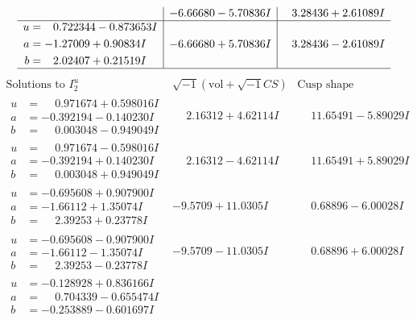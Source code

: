 \documentclass[1p]{elsarticle_modified}
\theoremstyle{definition}
\newcommand{\I}{\sqrt{-1}}
\begin{document}
$$\begin{array}{c|c|c}
 & -6.66680 - 5.70836 I & \phantom{-}3.28436 + 2.61089 I \\ \hline\begin{aligned}
u &= \phantom{-}0.722344 - 0.873653 I \\
a &= -1.27009 + 0.90834 I \\
b &= \phantom{-}2.02407 + 0.21519 I\end{aligned}
 & -6.66680 + 5.70836 I & \phantom{-}3.28436 - 2.61089 I\\
 \hline 
 \end{array}$$\newpage$$\begin{array}{c|c|c}  
\text{Solutions to }I^u_{2}& \I (\text{vol} + \sqrt{-1}CS) & \text{Cusp shape}\\
 \hline 
\begin{aligned}
u &= \phantom{-}0.971674 + 0.598016 I \\
a &= -0.392194 - 0.140230 I \\
b &= \phantom{-}0.003048 - 0.949049 I\end{aligned}
 & \phantom{-}2.16312 + 4.62114 I & \phantom{-}11.65491 - 5.89029 I \\ \hline\begin{aligned}
u &= \phantom{-}0.971674 - 0.598016 I \\
a &= -0.392194 + 0.140230 I \\
b &= \phantom{-}0.003048 + 0.949049 I\end{aligned}
 & \phantom{-}2.16312 - 4.62114 I & \phantom{-}11.65491 + 5.89029 I \\ \hline\begin{aligned}
u &= -0.695608 + 0.907900 I \\
a &= -1.66112 + 1.35074 I \\
b &= \phantom{-}2.39253 + 0.23778 I\end{aligned}
 & -9.5709 + 11.0305 I & \phantom{-}0.68896 - 6.00028 I \\ \hline\begin{aligned}
u &= -0.695608 - 0.907900 I \\
a &= -1.66112 - 1.35074 I \\
b &= \phantom{-}2.39253 - 0.23778 I\end{aligned}
 & -9.5709 - 11.0305 I & \phantom{-}0.68896 + 6.00028 I \\ \hline\begin{aligned}
u &= -0.128928 + 0.836166 I \\
a &= \phantom{-}0.704339 - 0.655474 I \\
b &= -0.253889 - 0.601697 I\end{aligned}

\end{array}$$
\end{document}
